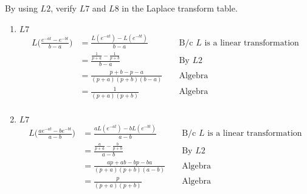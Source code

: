 \item [2.] By using $L2$, verify $L7$ and $L8$ in the Laplace transform table.
\begin{enumerate}
    \item [] $L7$
    \begin{align*}
    L\Bigg(\frac{e^{-at}-e^{-bt}}{b-a}\Bigg)& =\frac{L(e^{-at})-L(e^{-bt})}{b-a} && \text{ B/c $L$ is a linear transformation}\\
    & = \frac{\frac{1}{p+a}-\frac{1}{p+b}}{b-a} && \text{ By } L2\\
    & = \frac{p+b-p-a}{(p+a)(p+b)(b-a)} &&\text{ Algebra}\\
    & = \frac{1}{(p+a)(p+b)} &&\text{ Algebra}\\
    \end{align*}
    \item [] $L7$
    \begin{align*}
    L\Bigg(\frac{ae^{-at}-be^{-bt}}{a-b}\Bigg)& =\frac{aL(e^{-at})-bL(e^{-bt})}{a-b} && \text{ B/c $L$ is a linear transformation}\\
    & = \frac{\frac{a}{p+a}-\frac{b}{p+b}}{a-b} && \text{ By } L2\\
    & = \frac{ap+ab-bp-ba}{(p+a)(p+b)(a-b)} &&\text{ Algebra}\\
    & = \frac{p}{(p+a)(p+b)} &&\text{ Algebra}\\
    \end{align*}
\end{enumerate}
